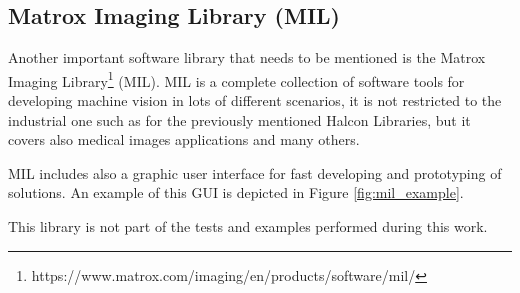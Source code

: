 \subsection{Matrox Imaging Library (MIL)}\label{subsec:mil}
Another important software library that needs to be mentioned is the Matrox Imaging Library\footnote{https://www.matrox.com/imaging/en/products/software/mil/} (MIL). MIL is a complete collection of software tools for developing machine vision in lots of different scenarios, it is not restricted to the industrial one such as for the previously mentioned Halcon Libraries, but it covers also medical images applications and many others.

MIL includes also a graphic user interface for fast developing and prototyping of solutions. An example of this GUI is depicted in Figure \ref{fig:mil_example}.

This library is not part of the tests and examples performed during this work.